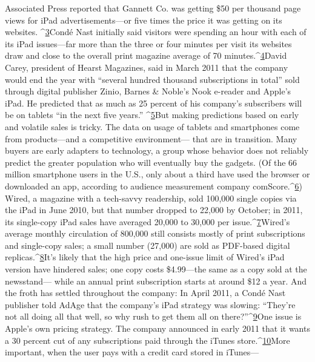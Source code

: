 Associated Press reported that Gannett Co. was getting \$50 per thousand page
views for iPad advertisements—or five times the price it was getting on its websites.
^{\href{#endnotes-chapter-4}{3}}Condé Nast initially said visitors were spending an hour with each of its
iPad issues—far more than the three or four minutes per visit its websites draw
and close to the overall print magazine average of 70 minutes.^{\href{#endnotes-chapter-4}{4}}David Carey, president
of Hearst Magazines, said in March 2011 that the company would end the
year with ``several hundred thousand subscriptions in total'' sold through digital
publisher Zinio, Barnes & Noble's Nook e-reader and Apple's iPad. He predicted
that as much as 25 percent of his company's subscribers will be on tablets ``in the
next five years.'' ^{\href{#endnotes-chapter-4}{5}}But making predictions based on early and volatile sales is tricky. The data on
usage of tablets and smartphones come from products—and a competitive environment—
that are in transition. Many buyers are early adapters to technology, a
group whose behavior does not reliably predict the greater population who will
eventually buy the gadgets. (Of the 66 million smartphone users in the U.S., only
about a third have used the browser or downloaded an app, according to audience
measurement company comScore.^{\href{#endnotes-chapter-4}{6}})
Wired, a magazine with a tech-savvy readership, sold 100,000 single copies via
the iPad in June 2010, but that number dropped to 22,000 by October; in 2011,
its single-copy iPad sales have averaged 20,000 to 30,000 per issue.^{\href{#endnotes-chapter-4}{7}}Wired's average
monthly circulation of 800,000 still consists mostly of print subscriptions
and single-copy sales; a small number (27,000) are sold as PDF-based digital
replicas.^{\href{#endnotes-chapter-4}{8}}It's likely that the high price and one-issue limit of Wired's iPad version
have hindered sales; one copy costs \$4.99—the same as a copy sold at the newsstand—
while an annual print subscription starts at around \$12 a year. And the
froth has settled throughout the company: In April 2011, a Condé Nast publisher
told AdAge that the company's iPad strategy was slowing: ``They're not all doing
all that well, so why rush to get them all on there?''^{\href{#endnotes-chapter-4}{9}}One issue is Apple's own pricing strategy. The company announced in early
2011 that it wants a 30 percent cut of any subscriptions paid through the iTunes
store.^{\href{#endnotes-chapter-4}{10}}More important, when the user pays with a credit card stored in iTunes—

